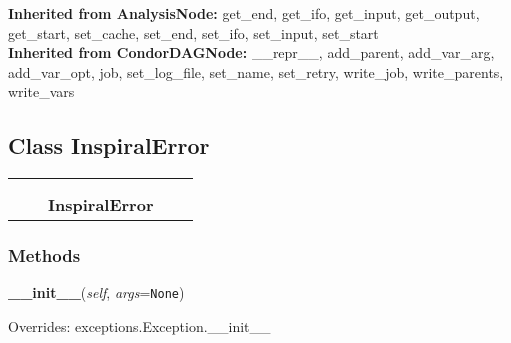   \noindent\textbf{Inherited from AnalysisNode:}
    get\_end,
    get\_ifo,
    get\_input,
    get\_output,
    get\_start,
    set\_cache,
    set\_end,
    set\_ifo,
    set\_input,
    set\_start
    \\
  \noindent\textbf{Inherited from CondorDAGNode:}
    \_\_repr\_\_,
    add\_parent,
    add\_var\_arg,
    add\_var\_opt,
    job,
    set\_log\_file,
    set\_name,
    set\_retry,
    write\_job,
    write\_parents,
    write\_vars


\subsection{Class InspiralError}

    \label{inspiral:InspiralError}
\begin{tabular}{cccccc}
\multicolumn{2}{r}{\settowidth{\BCL}{exceptions.Exception}\multirow{2}{\BCL}{exceptions.Exception}}
&&
  \\\cline{3-3}
  &&\multicolumn{1}{c|}{}
&&
  \\
&&\multicolumn{2}{l}{\textbf{InspiralError}}
\end{tabular}



  \subsubsection{Methods}

    \label{inspiral:InspiralError:__init__}
    \vspace{0.5ex}

    \noindent\begin{boxedminipage}{\textwidth}

    \raggedright \textbf{\_\_init\_\_}(\textit{self}, \textit{args}=\texttt{N\-o\-n\-e\-})

      Overrides: exceptions.Exception.\_\_init\_\_

    \end{boxedminipage}

